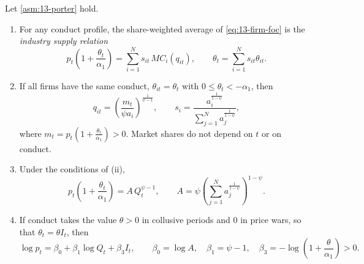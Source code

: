 \begin{proposition}\label{prop:13-porter-supply}
Let \cref{asm:13-porter} hold.
\begin{enumerate}[label=(\roman*)]
\item For any conduct profile, the share-weighted average of \eqref{eq:13-firm-foc} is the \emph{industry supply
relation}
\begin{equation}\label{eq:13-industry-foc}
  p_t\left(1 + \frac{\theta_t}{\alpha_1}\right) = \sum_{i=1}^N s_{it}\, MC_i(q_{it}), \qquad
  \theta_t = \sum_{i=1}^N s_{it}\theta_{it}.
\end{equation}
\item If all firms have the same conduct, $\theta_{it} = \theta_t$ with $0 \le \theta_t < -\alpha_1$, then
\begin{equation}\label{eq:13-shares}
  q_{it} = \left(\frac{m_t}{\psi a_i}\right)^{\frac{1}{\psi - 1}}, \qquad
  s_i = \frac{a_i^{\frac{1}{1-\psi}}}{\sum_{j=1}^N a_j^{\frac{1}{1-\psi}}},
\end{equation}
where $m_t = p_t(1 + \frac{\theta_t}{\alpha_1}) > 0$. Market shares do not depend on $t$ or on conduct.
\item Under the conditions of (ii),
\begin{equation}\label{eq:13-aggregate-supply}
  p_t\left(1 + \frac{\theta_t}{\alpha_1}\right) = A\, Q_t^{\psi - 1}, \qquad
  A = \psi\left(\sum_{j=1}^N a_j^{\frac{1}{1-\psi}}\right)^{1-\psi}.
\end{equation}
\item If conduct takes the value $\theta > 0$ in collusive periods and $0$ in price wars, so that
$\theta_t = \theta I_t$, then
\begin{equation}\label{eq:13-supply}
  \log p_t = \beta_0 + \beta_1 \log Q_t + \beta_3 I_t, \qquad
  \beta_0 = \log A, \quad \beta_1 = \psi - 1, \quad \beta_3 = -\log\left(1 + \frac{\theta}{\alpha_1}\right) > 0 .
\end{equation}
\end{enumerate}
\end{proposition}

